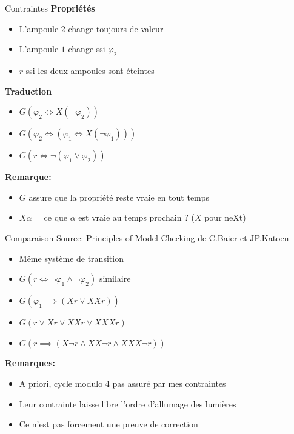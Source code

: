 \documentclass{beamer}
\begin{document}
\begin{frame}{Contraintes}
    \textbf{Propriétés}
    \begin{itemize}
        \item L'ampoule $2$ change toujours de valeur
        \item L'ampoule $1$ change ssi $\varphi_2$
        \item $r$ ssi les deux ampoules sont éteintes
    \end{itemize}
    \pause
    \textbf{Traduction}
    \begin{itemize}
        \item $G(\varphi_2 \Leftrightarrow X(\lnot\varphi_2))$
        \item $G(\varphi_2\Leftrightarrow(\varphi_1 \Leftrightarrow X(\lnot\varphi_1)))$
        \item $G(r \Leftrightarrow \lnot(\varphi_1\lor\varphi_2))$
    \end{itemize}
    \pause
    \textbf{Remarque: } 
    \begin{itemize}
        \item $G$ assure que la propriété reste vraie en tout temps
        \item $X\alpha$ = ce que $\alpha$ est vraie au temps prochain ? ($X$ pour neXt)
    \end{itemize}
\end{frame}

\begin{frame}{Comparaison}
    Source: Principles of Model Checking de C.Baier et JP.Katoen
    \begin{itemize}
        \item Même système de transition
        \item $G(r\Leftrightarrow\lnot\varphi_1\land\lnot\varphi_2)$ similaire
        \item $G(\varphi_1 \implies(Xr \lor XXr))$
        \item $G(r\lor Xr\lor XXr \lor XXXr)$
        \item $G(r\implies(X\lnot r \land XX\lnot r \land XXX \lnot r))$
    \end{itemize}
    
    \pause
    \textbf{Remarques:}
    \begin{itemize}
        \item A priori, cycle modulo 4 pas assuré par mes contraintes
        \item Leur contrainte laisse libre l'ordre d'allumage des lumières
        \item Ce n'est pas forcement une preuve de correction
    \end{itemize}
\end{frame}
\end{document}
